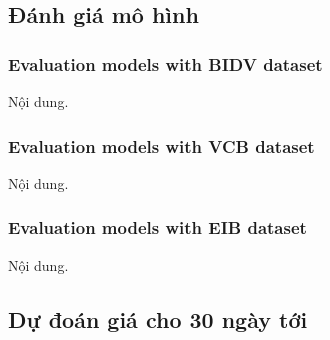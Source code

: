 \subsection{Đánh giá mô hình} 
\subsubsection{Evaluation models with BIDV dataset}
Nội dung.

\subsubsection{Evaluation models with VCB dataset}
Nội dung.

\subsubsection{Evaluation models with EIB dataset}
Nội dung.






\subsection{Dự đoán giá cho 30 ngày tới} 
